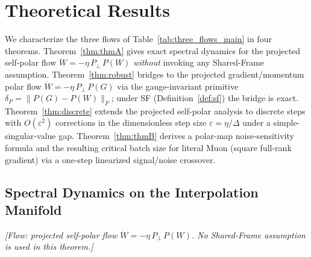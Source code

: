 \documentclass{article}
\begin{document}
\section{Theoretical Results}
\label{sec:theory}

We characterize the three flows of Table~\ref{tab:three_flows_main} in four theorems. Theorem~\ref{thm:thmA} gives exact spectral dynamics for the projected self-polar flow $\dot W=-\eta\,P_\perp\,P(W)$ \emph{without} invoking any Shared-Frame assumption. Theorem~\ref{thm:robust} bridges to the projected gradient/momentum polar flow $\dot W=-\eta\,P_\perp\,P(G)$ via the gauge-invariant primitive $\delta_P=\|P(G)-P(W)\|_F$; under \textsf{SF} (Definition~\ref{def:sf}) the bridge is exact. Theorem~\ref{thm:discrete} extends the projected self-polar analysis to discrete steps with $O(\varepsilon^2)$ corrections in the dimensionless step size $\varepsilon=\eta/\Delta$ under a simple-singular-value gap. Theorem~\ref{thm:thmB} derives a polar-map noise-sensitivity formula and the resulting critical batch size for literal Muon (square full-rank gradient) via a one-step linearized signal/noise crossover.

\subsection{Spectral Dynamics on the Interpolation Manifold}
\label{sec:theory:thmA}

\noindent\textit{[Flow: projected self-polar flow $\dot W = -\eta\,P_\perp\,P(W)$. No Shared-Frame assumption is used in this theorem.]}
\end{document}
